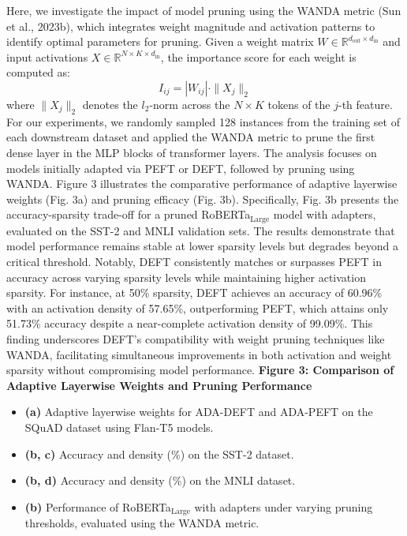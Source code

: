 \documentclass[conference]{IEEEtran}
\begin{document}
Here, we investigate the impact of model pruning using the WANDA metric (Sun et al., 2023b), which integrates weight magnitude and activation patterns to identify optimal parameters for pruning. Given a weight matrix \(W \in \mathbb{R}^{d_{\text{out}} \times d_{\text{in}}}\) and input activations \(X \in \mathbb{R}^{N \times K \times d_{\text{in}}}\), the importance score for each weight is computed as: \[I_{ij} = |W_{ij}| \cdot \|X_j\|_2\] where \(\|X_j\|_2\) denotes the \(l_2\)-norm across the \(N \times K\) tokens of the \(j\)-th feature. For our experiments, we randomly sampled 128 instances from the training set of each downstream dataset and applied the WANDA metric to prune the first dense layer in the MLP blocks of transformer layers. The analysis focuses on models initially adapted via PEFT or DEFT, followed by pruning using WANDA. Figure 3 illustrates the comparative performance of adaptive layerwise weights (Fig. 3a) and pruning efficacy (Fig. 3b). Specifically, Fig. 3b presents the accuracy-sparsity trade-off for a pruned RoBERTa\(_{\text{Large}}\) model with adapters, evaluated on the SST-2 and MNLI validation sets. The results demonstrate that model performance remains stable at lower sparsity levels but degrades beyond a critical threshold. Notably, DEFT consistently matches or surpasses PEFT in accuracy across varying sparsity levels while maintaining higher activation sparsity. For instance, at 50\% sparsity, DEFT achieves an accuracy of 60.96\% with an activation density of 57.65\%, outperforming PEFT, which attains only 51.73\% accuracy despite a near-complete activation density of 99.09\%. This finding underscores DEFT’s compatibility with weight pruning techniques like WANDA, facilitating simultaneous improvements in both activation and weight sparsity without compromising model performance. \textbf{Figure 3: Comparison of Adaptive Layerwise Weights and Pruning Performance}
\begin{itemize}
  \item \textbf{(a)} Adaptive layerwise weights for ADA-DEFT and ADA-PEFT on the SQuAD dataset using Flan-T5 models.
  \item \textbf{(b, c)} Accuracy and density (\%) on the SST-2 dataset.
  \item \textbf{(b, d)} Accuracy and density (\%) on the MNLI dataset.
  \item \textbf{(b)} Performance of RoBERTa\(_{\text{Large}}\) with adapters under varying pruning thresholds, evaluated using the WANDA metric.
\end{itemize}
\end{document}
